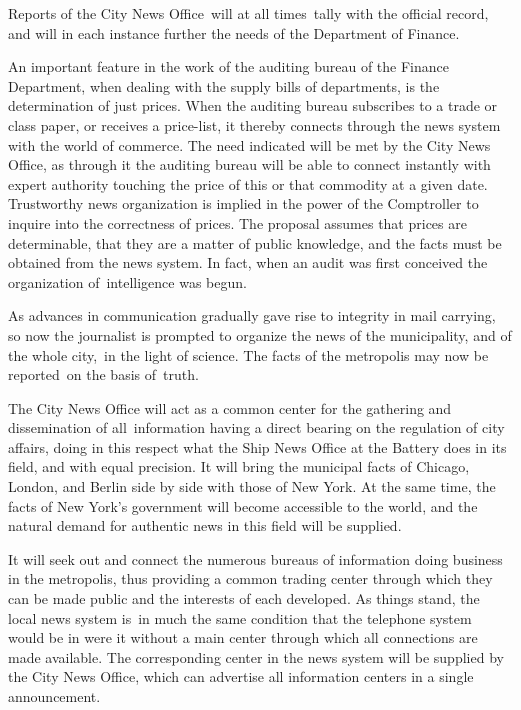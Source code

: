 \documentclass[openany,nobib]{tufte-book}
\begin{document}
\newpage Reports of the City News Office~will at all times~tally with the
official record, and will in each instance further the needs of the
Department of Finance.~

An important feature in the work of the auditing bureau of the Finance
Department, when dealing with the supply bills of departments, is the
determination of just prices. When the auditing bureau subscribes to a
trade or class paper, or receives a price-list, it thereby connects
through the news system with the world of commerce. The need indicated
will be met by the City News Office, as through it the auditing bureau
will be able to connect instantly with expert authority touching the
price of this or that commodity at a given date. Trustworthy news
organization is implied in the power of the Comptroller to inquire into
the correctness of prices. The proposal assumes that prices are
determinable, that they are a matter of public knowledge, and the facts
must be obtained from the news system. In fact, when an audit was first
conceived the organization of~intelligence was begun.~

As advances in communication gradually gave rise to integrity in mail
carrying, so now the journalist is prompted to organize the news of the
municipality, and of the whole city,~in the light of science. The facts
of the metropolis may now be reported~on the basis of~truth.~

The City News Office will act as a common center for the gathering and
dissemination of all~information having a direct bearing on the
regulation of city affairs, doing in this respect what the Ship News
Office at the Battery does in its field, and with equal precision. It
will bring the municipal facts of Chicago, London, and Berlin side by
side with those of New York. At the same time, the facts of New York's
government will become accessible to the world, and the natural demand
for authentic news in this field will be supplied.~

It will seek out and connect the numerous bureaus of information doing
business in the metropolis, thus providing a common trading center
through which they can be made public and the interests of each
developed. As things stand, the local news system is~in much the same
condition that the telephone system would be in were it without a main
center through which all connections are made available. The
corresponding center in the news system will be supplied by the City
News Office, which can advertise all information centers in a single
announcement.~~
\end{document}
